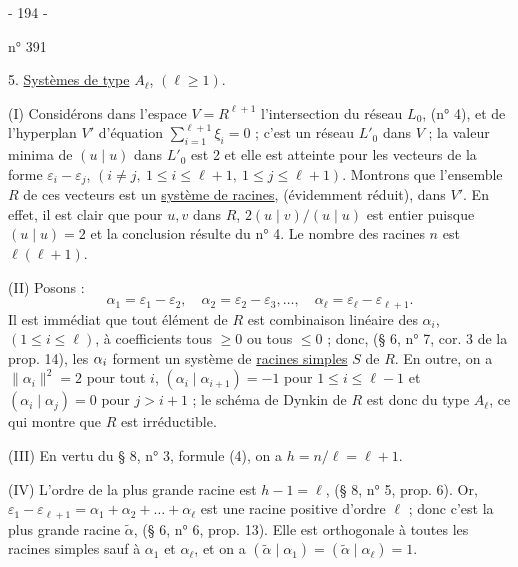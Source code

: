 \begin{center}- 194 -\end{center}
\hfill n° 391

5. \uline{Systèmes de type} $A_\ell$, $(\ell\geq1)$.

(I) Considérons dans l'espace $V=R^{\ell+1}$ l'intersection du réseau $L_0$, (n° 4), et de l'hyperplan $V'$ d'équation $\sum_{i=1}^{\ell+1}\xi_i=0$ ; c'est un réseau $L'_0$ dans $V$ ; la valeur minima de $(u\mid u)$ dans $L'_0$ est 2 et elle est atteinte pour les vecteurs de la forme $\varepsilon_i-\varepsilon_j$, $(i\ne j,\ 1\leq i\leq\ell+1,\ 1\leq j\leq\ell+1)$. Montrons que l'ensemble $R$ de ces vecteurs est un \uline{système de racines}, (évidemment réduit), dans $V'$. En effet, il est clair que pour $u,v$ dans $R$, $2(u\mid v)/(u\mid u)$ est entier puisque $(u\mid u)=2$ et la conclusion résulte du n° 4. Le nombre des racines $n$ est $\ell(\ell+1)$.

(II) Posons :
\[
\alpha_1=\varepsilon_1-\varepsilon_2,\quad
\alpha_2=\varepsilon_2-\varepsilon_3,\ldots,\quad
\alpha_\ell=\varepsilon_\ell-\varepsilon_{\ell+1}.
\]
Il est immédiat que tout élément de $R$ est combinaison linéaire des $\alpha_i$, $(1\leq i\leq\ell)$, à coefficients tous $\geq0$ ou tous $\leq0$ ; donc, (§ 6, n° 7, cor. 3 de la prop. 14), les ${\alpha_i}$ forment un système de \uline{racines simples} $S$ de $R$. En outre, on a $\|\alpha_i\|^2=2$ pour tout $i$, $(\alpha_i\mid\alpha_{i+1})=-1$ pour $1\leq i\leq\ell-1$ et $(\alpha_i\mid\alpha_j)=0$ pour $j>i+1$ ; le schéma de Dynkin de $R$ est donc du type $A_\ell$, ce qui montre que $R$ est irréductible.

(III) En vertu du § 8, n° 3, formule (4), on a $h=n/\ell=\ell+1$.

(IV) L'ordre de la plus grande racine est $h-1=\ell$, (§ 8, n° 5, prop. 6). Or, $\varepsilon_1-\varepsilon_{\ell+1}=\alpha_1+\alpha_2+\ldots+\alpha_\ell$ est une racine positive d'ordre $\ell$ ; donc c'est la plus grande racine $\tilde\alpha$, (§ 6, n° 6, prop. 13). Elle est orthogonale à toutes les racines simples sauf à $\alpha_1$ et $\alpha_\ell$, et on a $(\tilde\alpha\mid\alpha_1)=(\tilde\alpha\mid\alpha_\ell)=1$.
